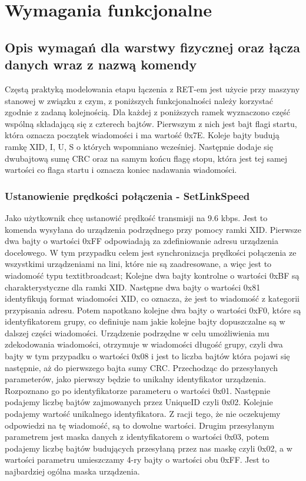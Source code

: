 \chapter{Wymagania funkcjonalne}
	\section{Opis wymagań dla warstwy fizycznej oraz łącza danych wraz z nazwą komendy}
		Częstą praktyką modelowania etapu łączenia z RET-em jest użycie przy maszyny stanowej w związku z czym, z poniższych funkcjonalności należy korzystać zgodnie z zadaną kolejnością.
		Dla każdej z poniższych ramek wyznaczono część wspólną składającą się z czterech bajtów. Pierwszym z nich jest bajt flagi startu, która oznacza początek wiadomości i ma wartość 0x7E.
		Koleje bajty budują ramkę XID, I, U, S o których wspomniano wcześniej. Następnie dodaje się dwubajtową sumę CRC oraz na samym końcu flagę stopu, która jest tej samej wartości co flaga startu i oznacza koniec nadawania wiadomości.
		\subsection{Ustanowienie prędkości połączenia - SetLinkSpeed}
			Jako użytkownik chcę ustanowić prędkość transmisji na 9.6 kbps.
			\newline\newline
			Jest to komenda wysyłana do urządzenia podrzędnego przy pomocy ramki XID.
			\newline
			Pierwsze dwa bajty o wartości 0xFF odpowiadają za zdefiniowanie adresu urządzenia docelowego. 
			W tym przypadku celem jest synchronizacja prędkości połączenia ze wszystkimi urządzeniami na lini, które nie są zaadresowane, a więc jest to wiadomość typu textit{broadcast};
			\newline
			Kolejne dwa bajty kontrolne o wartości 0xBF są charakterystyczne dla ramki XID.
			\newline
			Następne dwa bajty o wartości 0x81 identyfikują format wiadomości XID, co oznacza, że jest to wiadomość z kategorii przypisania adresu.
			\newline
			Potem napotkano kolejne dwa bajty o wartości 0xF0, które są identyfikatorem grupy, co definiuje nam jakie kolejne bajty dopuszczalne są w dalszej części wiadomości.
			\newline
			Urządzenie podrzędne w celu umożliwienia mu zdekodowania wiadomości, otrzymuje w wiadomości długość grupy, czyli dwa bajty w tym przypadku o wartości 0x08 i jest to 
			liczba bajtów która pojawi się następnie, aż do pierwszego bajta sumy CRC.
			\newline
			Przechodząc do przesyłanych parameterów, jako pierwszy będzie to unikalny identyfikator urządzenia. Rozpoznano go po identyfikatorze parameteru o wartości 0x01.
			Następnie podajemy liczbę bajtów zajmowanych przez UniqueID czyli 0x02. Kolejnie podajemy wartość unikalnego identyfikatora. Z racji tego, że nie oczekujemy odpowiedzi
			na tę wiadomość, są to dowolne wartości.
			Drugim przesyłanym parametrem jest maska danych z identyfikatorem o wartości 0x03, potem podajemy liczbę bajtów budujących przesyłaną przez nas maskę czyli 0x02, a w wartości 
			parametru umieszczamy 4-ry bajty o wartości obu 0xFF. Jest to najbardziej ogólna maska urządzenia.
